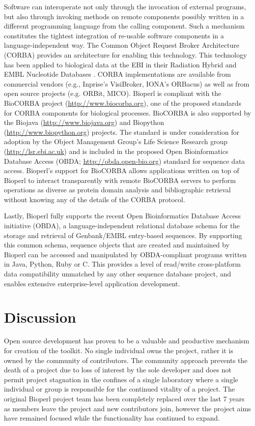 \documentclass[12pt]{article}
\begin{document}
Software can interoperate not only through the invocation of external
programs, but also through invoking methods on remote components
possibly written in a different programming language from the calling
component.  Such a mechanism constitutes the tightest integration of
re-usable software components in a language-independent way.  The
Common Object Request Broker Architecture (CORBA) \cite{corba}
provides an architecture for enabling this technology.  This
technology has been applied to biological data at the EBI in their
Radiation Hybrid \cite{rhdb} and EMBL Nucleotide Databases
\cite{embl-corba}.  CORBA implementations are available from
commercial vendors (e.g., Inprise's VisiBroker, IONA's ORBacus) as
well as from open source projects (e.g. ORBit, MICO).  Bioperl is
compliant with the BioCORBA project (\url{http://www.biocorba.org}),
one of the proposed standards for CORBA components for biological
processes.  BioCORBA is also supported by the Biojava
(\url{http://www.biojava.org}) and Biopython
(\url{http://www.biopython.org}) projects.  The standard is under
consideration for adoption by the Object Management Group's Life
Science Research group (\url{http://lsr.ebi.ac.uk}) and is included in
the proposed Open Bioinformatics Database Access (OBDA;
\url{http://obda.open-bio.org}) standard for sequence data access.
Bioperl's support for BioCORBA allows applications written on top of
Bioperl to interact transparently with remote BioCORBA servers to
perform operations as diverse as protein domain analysis and
bibliographic retrieval without knowing any of the details of the
CORBA protocol.

Lastly, Bioperl fully supports the recent Open Bioinformatics Database
Access initiative (OBDA), a language-independent relational database
schema for the storage and retrieval of Genbank/EMBL entry-based
sequences.  By supporting this common schema, sequence objects that
are created and maintained by Bioperl can be accessed and manipulated
by OBDA-compliant programs written in Java, Python, Ruby or C.  This
provides a level of read/write cross-platform data compatibility
unmatched by any other sequence database project, and enables
extensive enterprise-level application development.

\section{Discussion}

Open source development has proven to be a valuable and productive
mechanism for creation of the toolkit.  No single individual owns the
project, rather it is owned by the community of contributors.  The
community approach prevents the death of a project due to loss of
interest by the sole developer and does not permit project stagnation
in the confines of a single laboratory where a single individual or
group is responsible for the continued vitality of a project.  The
original Bioperl project team has been completely replaced over the
last 7 years as members leave the project and new contributors join,
however the project aims have remained focused while the
functionality has continued to expand.
\end{document}
